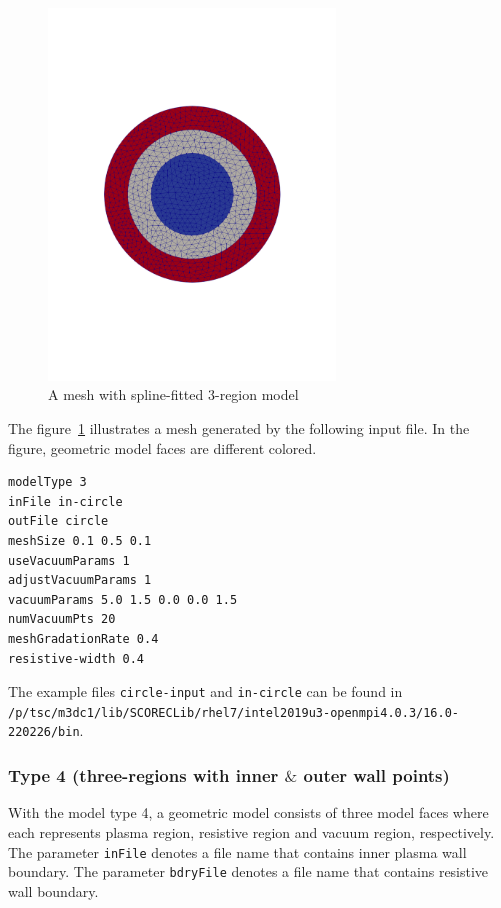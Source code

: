 \begin{figure}
\centering
\includegraphics[width=3in]{./figures/meshgen-type3.pdf}
\caption[Mesh with spline-fitted 3-region model]
{A mesh with spline-fitted 3-region model}
\label{fig:meshgen-type3}
\end{figure}

The figure~\ref{fig:meshgen-type3} illustrates a mesh generated by the following input file. In the figure, geometric model faces are different colored.

\begin{verbatim}
modelType 3
inFile in-circle
outFile circle
meshSize 0.1 0.5 0.1
useVacuumParams 1
adjustVacuumParams 1
vacuumParams 5.0 1.5 0.0 0.0 1.5
numVacuumPts 20
meshGradationRate 0.4
resistive-width 0.4
\end{verbatim}

The example files \texttt{circle-input} and \texttt{in-circle} can be found in
\newline\newline
\texttt{/p/tsc/m3dc1/lib/SCORECLib/rhel7/intel2019u3-openmpi4.0.3/16.0-220226/bin}.

\subsubsection{Type 4 (three-regions with inner $\&$ outer wall points)}

With the model type 4, a geometric model consists of three model faces where each represents plasma region, resistive region and vacuum region, respectively.  The parameter \texttt{inFile} denotes a file name that contains inner plasma wall boundary. The parameter \texttt{bdryFile} denotes a file name that contains resistive wall boundary.

